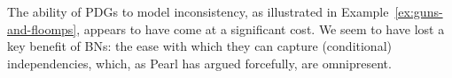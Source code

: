 \documentclass{article}
\theoremstyle{plain}
\theoremstyle{definition}
\theoremstyle{remark}
\numberwithin{equation}{section}
\begin{document}
		The ability of PDGs to model inconsistency, as illustrated in 
		Example~\ref{ex:guns-and-floomps}, 
		appears
		 to have come at a
		significant cost.
		We 
		seem to
		have lost a key benefit of BNs: the ease with which they can
capture (conditional) independencies,
which, as Pearl \cite{pearl1989conditional} has argued forcefully,
are omnipresent.  

	
\end{document}
